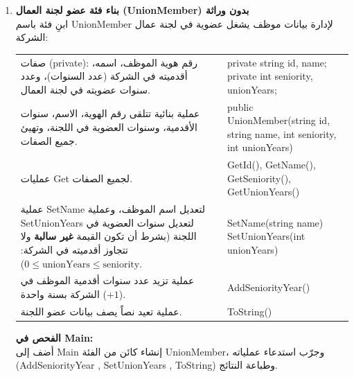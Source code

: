 \documentclass[14pt]{extarticle}
\begin{document}
\begin{enumerate}[label=\textbf{تمرين \arabic*:}, wide=0pt, leftmargin=*, itemsep=2.2em]
    \item \textbf{بناء فئة عضو لجنة العمال (\textenglish{UnionMember}) بدون وراثة} \\
    ابنِ فئة باسم \textenglish{UnionMember} لإدارة بيانات موظف يشغل عضوية في لجنة عمال الشركة:

    {\centering
    \renewcommand{\arraystretch}{1.2}
    \small
    \begin{tabular}{|>{\raggedleft\arraybackslash}p{}|>{\raggedright\arraybackslash}p{}|}
    \hline
    \multicolumn{2}{|c|}{\textbf{الفئة: \textenglish{UnionMember}}} \\
    \hline
    صفات (\textenglish{private}): رقم هوية الموظف، اسمه، أقدميته في الشركة (عدد السنوات)، وعدد سنوات عضويته في لجنة العمال. & \textenglish{private string id, name;} \newline \textenglish{private int seniority, unionYears;} \\
    \hline
    عملية بنائية تتلقى رقم الهوية، الاسم، سنوات الأقدمية، وسنوات العضوية في اللجنة، وتهيئ جميع الصفات. & \textenglish{public UnionMember(string id, string name, int seniority, int unionYears)} \\
    \hline
    عمليات \textenglish{Get} لجميع الصفات. & \textenglish{GetId(), GetName(), GetSeniority(), GetUnionYears()} \\
    \hline
    عملية \textenglish{SetName} لتعديل اسم الموظف، وعملية \textenglish{SetUnionYears} لتعديل سنوات العضوية في اللجنة (بشرط أن تكون القيمة \textbf{غير سالبة} ولا تتجاوز أقدميته في الشركة: $0 \le \text{unionYears} \le \text{seniority}$). & \textenglish{SetName(string name)} \newline \textenglish{SetUnionYears(int unionYears)} \\
    \hline
    عملية تزيد عدد سنوات أقدمية الموظف في الشركة بسنة واحدة ($+1$). & \textenglish{AddSeniorityYear()} \\
    \hline
    عملية تعيد نصاً يصف بيانات عضو اللجنة. & \textenglish{ToString()} \\
    \hline
    \end{tabular}
    \par} %

    \vspace{2em}
    \noindent \textbf{الفحص في \textenglish{Main}:} \\
    أضف إلى \textenglish{Main} إنشاء كائن من الفئة \textenglish{UnionMember}، وجرّب استدعاء عملياته \\
     (\textenglish{AddSeniorityYear} , \textenglish{SetUnionYears} , \textenglish{ToString}) وطباعة النتائج.


\end{enumerate}
\end{document}
